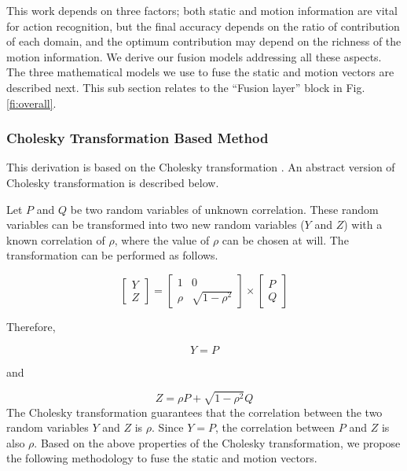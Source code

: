 
This work depends on {three factors}; both static and motion information
are vital for action recognition, but the final accuracy depends on the ratio of contribution of each domain,
and the optimum contribution may depend on the richness of the motion information. We derive our fusion models addressing all these aspects.
The three mathematical models we use
to fuse the static and motion vectors are described next. This sub section relates to the ``Fusion layer'' block in Fig. \ref{fi:overall}.

\subsubsection{Cholesky Transformation Based Method}
\label{ss:cholesky}
This derivation is based on the Cholesky transformation \cite{GOLUBG96}. An
abstract version of Cholesky transformation is described below.

Let $P$ and $Q$ be two random variables of unknown correlation. These random variables can be
transformed into two new random variables ($Y$ and $Z$) with a known correlation of $\rho$, where the
value of $\rho$ can be chosen at will. The transformation can be performed as follows.

\begin{equation}
\begin{bmatrix}
    Y     \\
    Z
\end{bmatrix}
=
\begin{bmatrix}
    1  & 0 \\
    \rho  & \sqrt{1-\rho^2}
\end{bmatrix}
\times
\begin{bmatrix}
    P     \\
    Q
\end{bmatrix}
\end{equation}

Therefore,

\begin{equation}
Y = P
\end{equation}

and

\begin{equation}
Z = \rho P + \sqrt{1-\rho^2}Q
\end{equation}
The Cholesky transformation guarantees that the correlation between the two random variables
$Y$ and $Z$ is $\rho$. Since $Y=P$, the correlation between $P$ and $Z$ is also $\rho$. Based on the above properties of the Cholesky transformation, we propose the following methodology to fuse the static and motion vectors.

